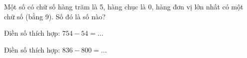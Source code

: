 \begin{ex}
Một số có chữ số hàng trăm là 5, hàng chục là 0, hàng đơn vị lớn nhất có một chữ số (bằng 9). Số đó là số nào?
\end{ex}

\begin{ex}
Điền số thích hợp: $754 - 54 = \dots$
\end{ex}

\begin{ex}
Điền số thích hợp: $836 - 800 = \dots$
\end{ex}
